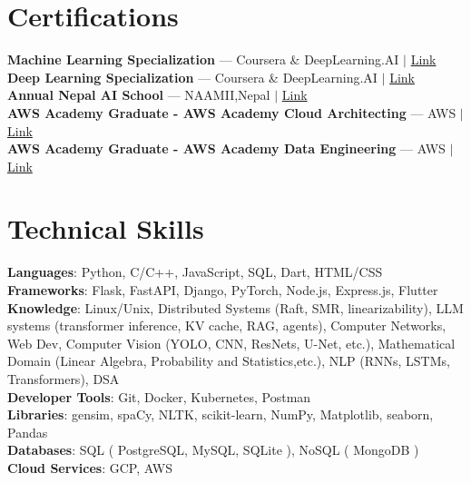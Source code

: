 \documentclass[letterpaper,11pt]{article}
\begin{document}
 \section{Certifications}
 \begin{itemize}[leftmargin=0.15in, label={}]
    \small{\item{
     \textbf{Machine Learning Specialization} --- Coursera \& DeepLearning.AI $|$ \href{https://www.coursera.org/account/accomplishments/specialization/certificate/UCBXAJSNHGZT}{Link} \\
     \textbf{Deep Learning Specialization}  --- Coursera \& DeepLearning.AI $|$ \href{https://www.coursera.org/account/accomplishments/specialization/certificate/UCBXAJSNHGZT}{Link}\\
     \textbf{Annual Nepal AI School} --- NAAMII,Nepal $|$ \href{https://drive.google.com/file/d/15_pX-sWftYpIucRH2JgwiGVqRODABdjE/view?usp=sharing}{Link}  \\
     \textbf{AWS Academy Graduate - AWS Academy Cloud Architecting} --- AWS $|$ \href{https://www.credly.com/badges/6e20049c-2d60-4e8e-b8df-80c5c2185a11/linked_in_profile}{Link}\\
     \textbf{AWS Academy Graduate - AWS Academy Data Engineering} --- AWS $|$ \href{https://drive.google.com/file/d/1Bd9PVuHlZdQLId6qMDCBYZ_S0cNnpoNK/view?usp=sharing}{Link}\\
    }}
 \end{itemize}

\section{Technical Skills}
 \begin{itemize}[leftmargin=0.15in, label={}]
    \small{\item{
     \textbf{Languages}{: Python, C/C++, JavaScript, SQL,  Dart, HTML/CSS } \\
     \textbf{Frameworks}{:  Flask, FastAPI, Django,  PyTorch, Node.js, Express.js, Flutter} \\  
     \textbf{Knowledge}{: Linux/Unix, Distributed Systems (Raft, SMR, linearizability), LLM systems (transformer inference, KV cache, RAG, agents), Computer Networks, Web Dev, Computer Vision (YOLO, CNN, ResNets, U-Net, etc.), Mathematical Domain (Linear Algebra, Probability and Statistics,etc.), NLP (RNNs, LSTMs, Transformers), DSA} \\
     \textbf{Developer Tools}{: Git, Docker, Kubernetes, Postman } \\
     \textbf{Libraries}{: gensim, spaCy, NLTK, scikit-learn, NumPy, Matplotlib,  seaborn, Pandas} \\
     \textbf{Databases}{: SQL ( PostgreSQL, MySQL, SQLite ), NoSQL ( MongoDB ) } \\
     \textbf{Cloud Services}{: GCP, AWS} \\
    }}
 \end{itemize}
\end{document}
